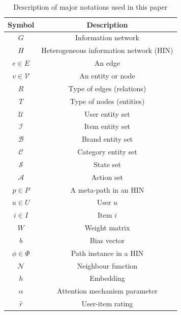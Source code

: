 \begin{table}[t]
	\centering
	\begin{tabular}{c|c}
		\hline
		\textbf{Symbol}  & \textbf{Description}                          \\ \hline
		$G$              & {Information network}    \\\hline
		$H$              & Heterogeneous information network (HIN)       \\\hline
		$e\in E$         & An edge                  \\\hline
		$v\in \mathcal{V}$         & An entity or node            \\\hline
		$R$            	 & Type of edges (relations) \\\hline
		$T$            	 & Type of nodes (entities)   \\\hline
		$\mathcal{U}$      & User entity set     \\ \hline
		$\mathcal{I}$      & Item entity set     \\ \hline
		$\mathcal{B}$      & Brand entity set    \\ \hline
		$\mathcal{C}$      & Category entity set \\ \hline
		$\mathcal{S}$      & State set \\ \hline
		$\mathcal{A}$      & Action set \\ \hline
		$p\in P$         & A meta-path in an HIN                              \\\hline
		$u\in U$         & User $u$                     \\\hline
		$i\in I$         & Item $i$                    \\\hline
		$W$              & Weight matrix                                 \\\hline
		$b$              & Bias vector                                   \\\hline
		$\phi \in \Phi$  & Path instance in a HIN                               \\\hline
		$\mathcal{N}$      & Neighbour function \\ \hline
		$h$              & Embedding                                     \\\hline
		$\alpha$         & Attention mechanism parameter                 \\ \hline
		$\hat r$              & User-item rating                             \\ \hline
	\end{tabular}
	\caption{\label{table_notations}Description of major notations used in this paper}
\end{table}



